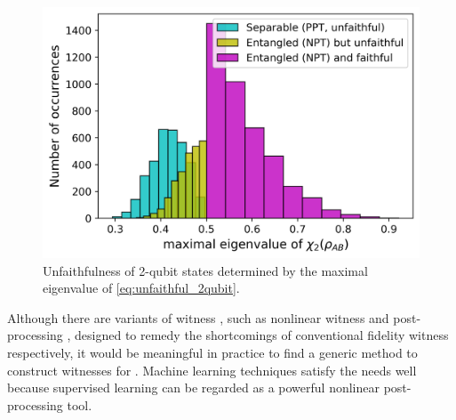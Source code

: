 \documentclass[
aps,
pra,
twocolumn,
floatfix,
]{revtex4-2}
\theoremstyle{plain}
\theoremstyle{definition}
\begin{document}
\begin{figure}[!ht]
	\centering
	\includegraphics[width=.9\linewidth]{./Code/faithfulness_2_qubit.png}
	\caption{Unfaithfulness of 2-qubit states determined by the maximal eigenvalue of \cref{eq:unfaithful_2qubit}.}
	\label{fig:unfaithfulness}
\end{figure}

Although there are variants of witness \cite{zhouEntanglementDetectionCoherent2020}, such as nonlinear witness \cite{guhneNonlinearEntanglementWitnesses2006} and post-processing \cite{zhanDetectingEntanglementUnfaithful2021}, designed to remedy the shortcomings of conventional fidelity witness respectively, 
it would be meaningful in practice to find a generic method to construct witnesses for .
Machine learning techniques satisfy the needs well because supervised learning can be regarded as a powerful nonlinear post-processing tool.
\end{document}

